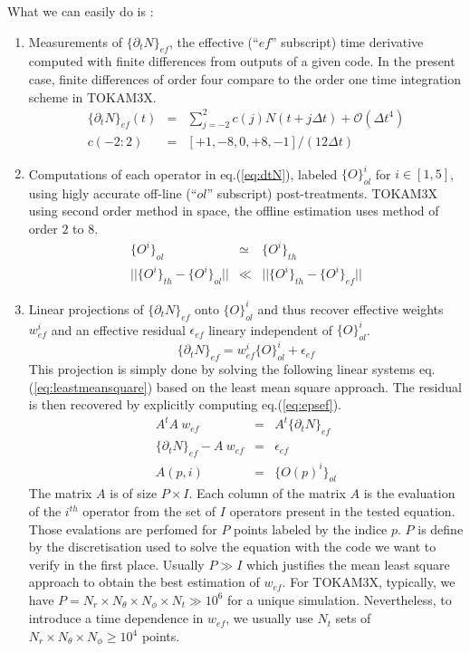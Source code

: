 \documentclass[12pt,a4paper]{paper}
\newcommand{\acc}[2]{ \{ #1 \}_{#2} }
\begin{document}
What we can easily do is :
\begin{enumerate}
\item Measurements of $\acc{\partial_t N}{ef}$, the effective (``$ef$'' subscript) time derivative computed with finite differences from outputs of a given code. In the present case, finite differences of order four compare to the order one time integration scheme in TOKAM3X.
  \begin{eqnarray}
    \acc{\partial_t N}{ef}(t) &=& \sum_{j=-2}^2 c(j) N(t+j\Delta t) + \mathcal{O}(\Delta t^4)\\
    c(-2:2) &=& [+1,-8,0,+8,-1]/(12\Delta t)
  \end{eqnarray}
\item Computations of each operator in eq.(\ref{eq:dtN}), labeled $\acc{O}{ol}^i$ for $i \in [1,5]$, using higly accurate off-line (``$ol$'' subscript) post-treatments. TOKAM3X using second order method in space, the offline estimation uses method of order $2$ to $8$.
  \begin{eqnarray}
    \acc{O^i}{ol} &\simeq& \acc{O^i}{th} \label{eq:olvsth}\\
    ||\acc{O^i}{th}- \acc{O^i}{ol}|| &\ll&  ||\acc{O^i}{th}- \acc{O^i}{ef}|| \label{eq:tholef}
  \end{eqnarray}
\item Linear projections of $\acc{\partial_t N}{ef}$ onto $\acc{O}{ol}^i$ and thus recover effective weights $w^i_{ef}$ and an effective residual $\epsilon_{ef}$ lineary independent of $\acc{O}{ol}^i$.
  \begin{equation}
    \acc{\partial_t N}{ef} = w^i_{ef} \acc{O}{ol}^i + \epsilon_{ef}
  \end{equation}
  This projection is simply done by solving the following linear systems eq.(\ref{eq:leastmeansquare}) based on the least mean square approach. The residual is then recovered by explicitly computing eq.(\ref{eq:epsef}).
\begin{eqnarray}
  A^t A ~ w_{ef} &=& A^t \acc{\partial_t N}{ef} \label{eq:leastmeansquare}\\
  \acc{\partial_t N}{ef} - A ~ w_{ef} &=& \epsilon_{ef} \label{eq:epsef}\\
  A(p,i) &=& \acc{O(p)^i}{ol}
\end{eqnarray}
The matrix $A$ is of size $P \times I$. Each column of the matrix $A$ is the evaluation of the $i^{th}$ operator from the set of $I$ operators present in the tested equation. Those evalations are perfomed for $P$ points labeled by the indice $p$. $P$ is define by the discretisation used to solve the equation with the code we want to verify in the first place. Usually $P\gg I$ which justifies the mean least square approach to obtain the best estimation of $w_{ef}$. For TOKAM3X, typically, we have $P = N_{r} \times N_{\theta} \times N_{\phi} \times N_t \gg 10^6$ for a unique simulation. Nevertheless, to introduce a time dependence in $w_{ef}$, we usually use $N_t$ sets of $  N_{r} \times N_{\theta} \times N_{\phi} \ge 10^4$ points.
%
\end{enumerate}
\end{document}
